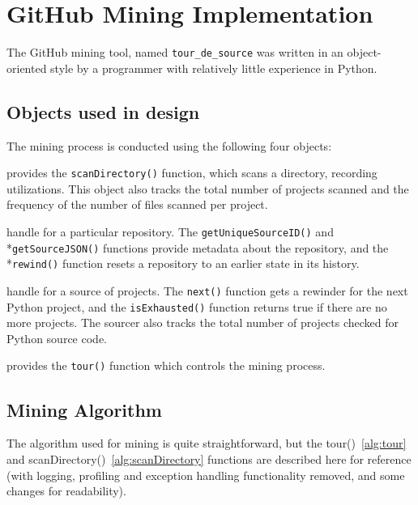 \section*{GitHub Mining Implementation}
\label{app:miningImplementation}

The GitHub mining tool, named {\tt tour\_de\_source} was written in an object-oriented style by a programmer with relatively little experience in Python.

\subsection*{Objects used in design}
The mining process is conducted using the following four objects:
\begin{description} \itemsep -1pt
\item[Scanner] provides the {\tt scanDirectory()} function, which scans a directory, recording utilizations.  This object also tracks the total number of projects scanned and the frequency of the number of files scanned per project.
\item[Rewinder] handle for a particular repository. The {\tt getUniqueSourceID()} and \\*{\tt getSourceJSON()} functions provide metadata about the repository, and the \\*{\tt rewind()} function resets a repository to an earlier state in its history.
\item[Sourcer] handle for a source of projects.  The {\tt next()} function gets a rewinder for the next Python project, and the {\tt isExhausted()} function returns true if there are no more projects.  The sourcer also tracks the total number of projects checked for Python source code.
\item[Tourist] provides the {\tt tour()} function which controls the mining process.
\end{description}

\subsection*{Mining Algorithm}
The algorithm used for mining is quite straightforward, but the tour()~\ref{alg:tour} and scanDirectory()~\ref{alg:scanDirectory} functions are described here for reference (with logging, profiling and exception handling functionality removed, and some changes for readability).

